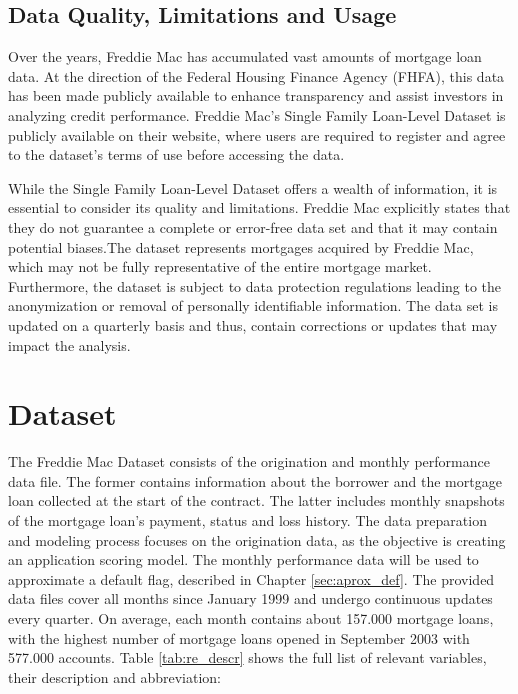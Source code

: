 \subsection{Data Quality, Limitations and Usage}

Over the years, Freddie Mac has accumulated vast amounts of mortgage loan data. At the direction of the Federal Housing Finance Agency (FHFA), this data has been made publicly available to enhance transparency and assist investors in analyzing credit performance. Freddie Mac's Single Family Loan-Level Dataset is publicly available on their website, where users are required to register and agree to the dataset's terms of use before accessing the data.\cite{FreddieMacData:2023}

While the Single Family Loan-Level Dataset offers a wealth of information, it is essential to consider its quality and limitations. Freddie Mac explicitly states  that they do not guarantee a complete or error-free data set and that it may contain potential biases.The dataset represents mortgages acquired by Freddie Mac, which may not be fully representative of the entire mortgage market. Furthermore, the dataset is subject to data protection regulations leading to the anonymization or removal of personally identifiable information. The data set is updated on a quarterly basis and thus, contain corrections or updates that may impact the analysis.\cite{FreddieMacUG:2023}



\section{Dataset}

The Freddie Mac Dataset consists of the origination and monthly performance data file. The former contains information about the borrower and the mortgage loan collected at the start of the contract. The latter includes monthly snapshots of the mortgage loan's payment, status and loss history. The data preparation and modeling process focuses on the origination data, as the objective is creating an application scoring model. The monthly performance data will be used to approximate a default flag, described in Chapter \ref{sec:aprox_def}. The provided data files cover all months since January 1999 and undergo continuous updates every quarter. On average, each month contains about 157.000 mortgage loans, with the highest number of mortgage loans opened in September 2003 with 577.000 accounts. Table \ref{tab:re_descr} shows the full list of relevant variables, their description and abbreviation:

